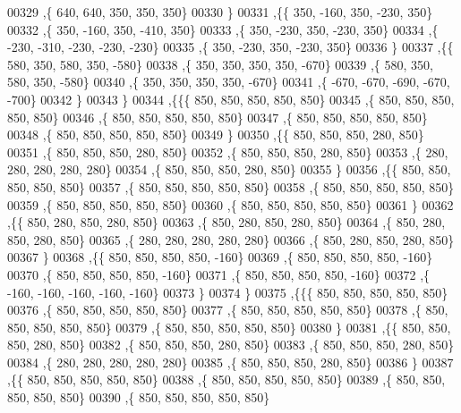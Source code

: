 \begin{DoxyCode}
00329    ,\{   640,   640,   350,   350,   350\}
00330    \}
00331   ,\{\{   350,  -160,   350,  -230,   350\}
00332    ,\{   350,  -160,   350,  -410,   350\}
00333    ,\{   350,  -230,   350,  -230,   350\}
00334    ,\{  -230,  -310,  -230,  -230,  -230\}
00335    ,\{   350,  -230,   350,  -230,   350\}
00336    \}
00337   ,\{\{   580,   350,   580,   350,  -580\}
00338    ,\{   350,   350,   350,   350,  -670\}
00339    ,\{   580,   350,   580,   350,  -580\}
00340    ,\{   350,   350,   350,   350,  -670\}
00341    ,\{  -670,  -670,  -690,  -670,  -700\}
00342    \}
00343   \}
00344  ,\{\{\{   850,   850,   850,   850,   850\}
00345    ,\{   850,   850,   850,   850,   850\}
00346    ,\{   850,   850,   850,   850,   850\}
00347    ,\{   850,   850,   850,   850,   850\}
00348    ,\{   850,   850,   850,   850,   850\}
00349    \}
00350   ,\{\{   850,   850,   850,   280,   850\}
00351    ,\{   850,   850,   850,   280,   850\}
00352    ,\{   850,   850,   850,   280,   850\}
00353    ,\{   280,   280,   280,   280,   280\}
00354    ,\{   850,   850,   850,   280,   850\}
00355    \}
00356   ,\{\{   850,   850,   850,   850,   850\}
00357    ,\{   850,   850,   850,   850,   850\}
00358    ,\{   850,   850,   850,   850,   850\}
00359    ,\{   850,   850,   850,   850,   850\}
00360    ,\{   850,   850,   850,   850,   850\}
00361    \}
00362   ,\{\{   850,   280,   850,   280,   850\}
00363    ,\{   850,   280,   850,   280,   850\}
00364    ,\{   850,   280,   850,   280,   850\}
00365    ,\{   280,   280,   280,   280,   280\}
00366    ,\{   850,   280,   850,   280,   850\}
00367    \}
00368   ,\{\{   850,   850,   850,   850,  -160\}
00369    ,\{   850,   850,   850,   850,  -160\}
00370    ,\{   850,   850,   850,   850,  -160\}
00371    ,\{   850,   850,   850,   850,  -160\}
00372    ,\{  -160,  -160,  -160,  -160,  -160\}
00373    \}
00374   \}
00375  ,\{\{\{   850,   850,   850,   850,   850\}
00376    ,\{   850,   850,   850,   850,   850\}
00377    ,\{   850,   850,   850,   850,   850\}
00378    ,\{   850,   850,   850,   850,   850\}
00379    ,\{   850,   850,   850,   850,   850\}
00380    \}
00381   ,\{\{   850,   850,   850,   280,   850\}
00382    ,\{   850,   850,   850,   280,   850\}
00383    ,\{   850,   850,   850,   280,   850\}
00384    ,\{   280,   280,   280,   280,   280\}
00385    ,\{   850,   850,   850,   280,   850\}
00386    \}
00387   ,\{\{   850,   850,   850,   850,   850\}
00388    ,\{   850,   850,   850,   850,   850\}
00389    ,\{   850,   850,   850,   850,   850\}
00390    ,\{   850,   850,   850,   850,   850\}

\end{DoxyCode}
